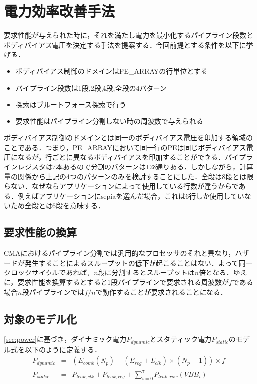 {\section{電力効率改善手法}
\label{sec:optimization_method}


要求性能が与えられた時に，それを満たし電力を最小化するパイプライン段数とボディバイアス電圧を決定する手法を提案する．今回前提とする条件を以下に挙げる．
\begin{itemize}
\item ボディバイアス制御のドメインはPE\_ARRAYの行単位とする
\item パイプライン段数は1段,2段,4段,全段の4パターン
\item 探索はブルートフォース探索で行う
\item 要求性能はパイプライン分割しない時の周波数で与えられる
\end{itemize}

ボディバイアス制御のドメインとは同一のボディバイアス電圧を印加する領域のことである．つまり，PE\_ARRAYにおいて同一行のPEは同じボディバイアス電圧になるが，行ごとに異なるボディバイアスを印加することができる．パイプラインレジスタは7本あるので分割のパターンは128通りある．しかしながら，計算量の関係から上記の4つのパターンのみを検討することにした．全段は8段とは限らない．なぜならアプリケーションによって使用している行数が違うからである．例えばアプリケーションにsepiaを選んだ場合，これは6行しか使用していないため全段とは6段を意味する．

\subsection{要求性能の換算}
\label{subsec:performance_conversion}
CMAにおけるパイプライン分割では汎用的なプロセッサのそれと異なり，ハザードが発生することによるスループットの低下が起こることはない．よって同一クロックサイクルであれば，$n$段に分割するとスループットは$n$倍となる．ゆえに，要求性能を換算するとすると1段パイプラインで要求される周波数が$f$である場合$n$段パイプラインでは$f/n$で動作することが要求されることになる．

\subsection{対象のモデル化}
\label{subsec:modeling}
\ref{sec:power}に基づき，ダイナミック電力$P_{dynamic}$とスタティック電力$P_{static}$のモデル式を以下のように定義する．
\begin{eqnarray}
P_{dynamic} &=& \left(E_{comb}(N_p) + (E_{reg} + E_{clk}) \times (N_p - 1) \right) \times f\\
\label{eq:dynamic}
P_{static} &=& P_{leak,clk} + P_{leak,reg} + \sum_{i=0}^{7}P_{leak,row}(VBB_i)
\label{eq:static}
\end{eqnarray}

}
